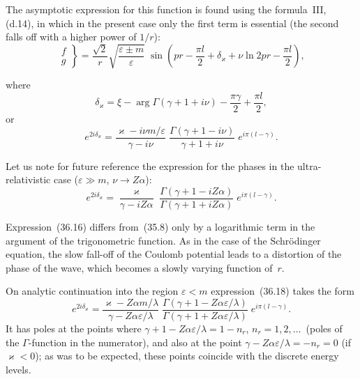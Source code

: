 The asymptotic expression for this function is found using the formula~III, (d.14), in which in the present case only the first term is essential (the second falls off with a higher power of $1/r$):
\begin{equation}
\left.\begin{aligned} f \\ g \end{aligned}\right\}
= \frac{\sqrt{2}}{r}\sqrt{\frac{\varepsilon\pm m}{\varepsilon}}\;\sin\!\left(pr - \frac{\pi l}{2} + \delta_\varkappa + \nu\ln 2pr - \frac{\pi l}{2}\right),
\tag{36.16}
\end{equation}

where
\begin{equation}
\delta_\varkappa = \xi - \arg\Gamma(\gamma + 1 + i\nu) - \frac{\pi\gamma}{2} + \frac{\pi l}{2},
\tag{36.17}
\end{equation}
or
\begin{equation}
e^{2i\delta_\varkappa} = \frac{\varkappa - i\nu m/\varepsilon}{\gamma - i\nu}\;\frac{\Gamma(\gamma + 1 - i\nu)}{\gamma + 1 + i\nu}\;e^{i\pi(l - \gamma)}.
\tag{36.18}
\end{equation}

Let us note for future reference the expression for the phases in the ultra-relativistic case ($\varepsilon \gg m$, $\nu \to Z\alpha$):
\begin{equation}
e^{2i\delta_\varkappa} = \frac{\varkappa}{\gamma - iZ\alpha}\;\frac{\Gamma(\gamma + 1 - iZ\alpha)}{\Gamma(\gamma + 1 + iZ\alpha)}\;e^{i\pi(l-\gamma)}.
\tag{36.19}
\end{equation}

Expression~(36.16) differs from~(35.8) only by a logarithmic term in the argument of the trigonometric function. As in the case of the Schr\"odinger equation, the slow fall-off of the Coulomb potential leads to a distortion of the phase of the wave, which becomes a slowly varying function of~$r$.

On analytic continuation into the region $\varepsilon < m$ expression~(36.18) takes the form
\begin{equation}
e^{2i\delta_\varkappa} = \frac{\varkappa - Z\alpha m/\lambda}{\gamma - Z\alpha\varepsilon/\lambda}\;\frac{\Gamma(\gamma + 1 - Z\alpha\varepsilon/\lambda)}{\Gamma(\gamma + 1 + Z\alpha\varepsilon/\lambda)}\;e^{i\pi(l-\gamma)}.
\tag{36.20}
\end{equation}
It has poles at the points where $\gamma + 1 - Z\alpha\varepsilon/\lambda = 1 - n_r$, $n_r = 1, 2, \ldots\,$ (poles of the $\Gamma$-function in the numerator), and also at the point $\gamma - Z\alpha\varepsilon/\lambda = -n_r = 0$ (if $\varkappa < 0$); as was to be expected, these points coincide with the discrete energy levels.

